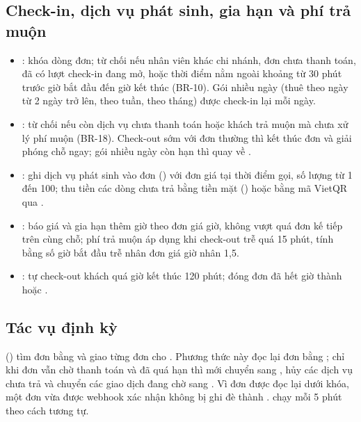 \subsection{Check-in, dịch vụ phát sinh, gia hạn và phí trả muộn}

\begin{itemize}
    \item {}: khóa dòng đơn; từ chối nếu nhân viên khác chi nhánh, đơn chưa thanh toán, đã có lượt check-in đang mở, hoặc thời điểm nằm ngoài khoảng từ 30 phút trước giờ bắt đầu đến giờ kết thúc (BR-10). Gói nhiều ngày (thuê theo ngày từ 2 ngày trở lên, theo tuần, theo tháng) được check-in lại mỗi ngày.
    \item {}: từ chối nếu còn dịch vụ chưa thanh toán hoặc khách trả muộn mà chưa xử lý phí muộn (BR-18). Check-out sớm với đơn thường thì kết thúc đơn và giải phóng chỗ ngay; gói nhiều ngày còn hạn thì quay về .
    \item {}: ghi dịch vụ phát sinh vào đơn () với đơn giá tại thời điểm gọi, số lượng từ 1 đến 100; thu tiền các dòng chưa trả bằng tiền mặt () hoặc bằng mã VietQR qua .
    \item {}: báo giá và gia hạn thêm giờ theo đơn giá giờ, không vượt quá đơn kế tiếp trên cùng chỗ; phí trả muộn áp dụng khi check-out trễ quá 15 phút, tính bằng số giờ bắt đầu trễ nhân đơn giá giờ nhân 1,5.
    \item {}: tự check-out khách quá giờ kết thúc 120 phút; đóng đơn đã hết giờ thành  hoặc .
\end{itemize}

\subsection{Tác vụ định kỳ}
 () tìm đơn bằng  và giao từng đơn cho . Phương thức này đọc lại đơn bằng ; chỉ khi đơn vẫn chờ thanh toán và đã quá hạn thì mới chuyển sang , hủy các dịch vụ chưa trả và chuyển các giao dịch đang chờ sang . Vì đơn được đọc lại dưới khóa, một đơn vừa được webhook xác nhận không bị ghi đè thành .  chạy mỗi 5 phút theo cách tương tự.


